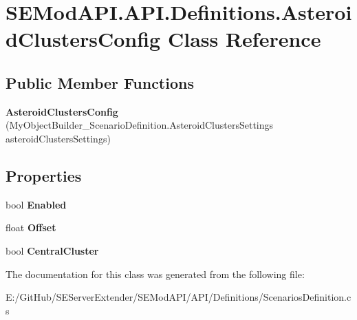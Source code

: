 \hypertarget{class_s_e_mod_a_p_i_1_1_a_p_i_1_1_definitions_1_1_asteroid_clusters_config}{}\section{S\+E\+Mod\+A\+P\+I.\+A\+P\+I.\+Definitions.\+Asteroid\+Clusters\+Config Class Reference}
\label{class_s_e_mod_a_p_i_1_1_a_p_i_1_1_definitions_1_1_asteroid_clusters_config}
\subsection*{Public Member Functions}
\begin{DoxyCompactItemize}
\item 
\hypertarget{class_s_e_mod_a_p_i_1_1_a_p_i_1_1_definitions_1_1_asteroid_clusters_config_a14341cf1c2a793a26cc826fb16d23915}{}{\bfseries Asteroid\+Clusters\+Config} (My\+Object\+Builder\+\_\+\+Scenario\+Definition.\+Asteroid\+Clusters\+Settings asteroid\+Clusters\+Settings)\label{class_s_e_mod_a_p_i_1_1_a_p_i_1_1_definitions_1_1_asteroid_clusters_config_a14341cf1c2a793a26cc826fb16d23915}

\end{DoxyCompactItemize}
\subsection*{Properties}
\begin{DoxyCompactItemize}
\item 
\hypertarget{class_s_e_mod_a_p_i_1_1_a_p_i_1_1_definitions_1_1_asteroid_clusters_config_a1396d51b0201917545dd74e86a721407}{}bool {\bfseries Enabled}\label{class_s_e_mod_a_p_i_1_1_a_p_i_1_1_definitions_1_1_asteroid_clusters_config_a1396d51b0201917545dd74e86a721407}

\item 
\hypertarget{class_s_e_mod_a_p_i_1_1_a_p_i_1_1_definitions_1_1_asteroid_clusters_config_ac051085dd537f6b32d9a3940af94fda5}{}float {\bfseries Offset}\label{class_s_e_mod_a_p_i_1_1_a_p_i_1_1_definitions_1_1_asteroid_clusters_config_ac051085dd537f6b32d9a3940af94fda5}

\item 
\hypertarget{class_s_e_mod_a_p_i_1_1_a_p_i_1_1_definitions_1_1_asteroid_clusters_config_a64ae0385f8575b0e92670d690f9c4960}{}bool {\bfseries Central\+Cluster}\label{class_s_e_mod_a_p_i_1_1_a_p_i_1_1_definitions_1_1_asteroid_clusters_config_a64ae0385f8575b0e92670d690f9c4960}

\end{DoxyCompactItemize}


The documentation for this class was generated from the following file\+:\begin{DoxyCompactItemize}
\item 
E\+:/\+Git\+Hub/\+S\+E\+Server\+Extender/\+S\+E\+Mod\+A\+P\+I/\+A\+P\+I/\+Definitions/Scenarios\+Definition.\+cs\end{DoxyCompactItemize}
